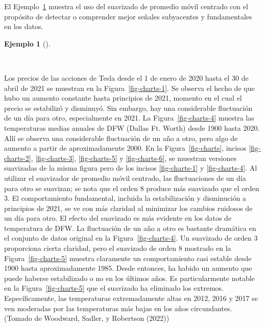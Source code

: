 \documentclass[
  us-letterpaper,
]{scrreprt}
\theoremstyle{plain}
\theoremstyle{definition}
\theoremstyle{definition}
\newtheorem{example}{Ejemplo}[chapter]
\theoremstyle{plain}
\theoremstyle{remark}
\begin{document}
El Ejemplo~\ref{exm-ejem} muestra el uso del suavizado de promedio móvil
centrado con el propósito de detectar o comprender mejor señales
subyacentes y fundamentales en los datos.

\begin{example}[]\protect\hypertarget{exm-ejem}{}\label{exm-ejem}

~

\begin{tcolorbox}[enhanced jigsaw, breakable, colbacktitle=quarto-callout-caution-color!10!white, rightrule=.15mm, toptitle=1mm, colback=white, left=2mm, colframe=quarto-callout-caution-color-frame, bottomtitle=1mm, opacitybacktitle=0.6, leftrule=.75mm, arc=.35mm, title={Suavizando los datos de temperatura de Tesla y DFW.}, coltitle=black, titlerule=0mm, opacityback=0, bottomrule=.15mm, toprule=.15mm]

Los precios de las acciones de Tesla desde el 1 de enero de 2020 hasta
el 30 de abril de 2021 se muestran en la Figura~\ref{fig-charts-1}. Se
observa el hecho de que hubo un aumento constante hasta principios de
2021, momento en el cual el precio se estabilizó y disminuyó. Sin
embargo, hay una considerable fluctuación de un día para otro,
especialmente en 2021. La Figura~\ref{fig-charts-4} muestra las
temperaturas medias anuales de DFW (Dallas Ft. Worth) desde 1900 hasta
2020. Allí se observa una considerable fluctuación de un año a otro,
pero algo de aumento a partir de aproximadamente 2000. En la
Figura~\ref{fig-charts}, incisos \ref{fig-charts-2}, \ref{fig-charts-3},
\ref{fig-charts-5} y \ref{fig-charts-6}, se muestran versiones
suavizadas de la misma figura pero de los incisos \ref{fig-charts-1} y
\ref{fig-charts-4}. Al utilizar el suavizador de promedio móvil
centrado, las fluctuaciones de un día para otro se suavizan; se nota que
el orden 8 produce más suavizado que el orden 3. El comportamiento
fundamental, incluida la estabilización y disminución a principios de
2021, se ve con más claridad al minimizar los cambios ruidosos de un día
para otro. El efecto del suavizado es más evidente en los datos de
temperatura de DFW. La fluctuación de un año a otro es bastante
dramática en el conjunto de datos original en la
Figura~\ref{fig-charts-4}. Un suavizado de orden 3 proporciona cierta
claridad, pero el suavizado de orden 8 mostrado en la
Figura~\ref{fig-charts-5} muestra claramente un comportamiento casi
estable desde 1900 hasta aproximadamente 1985. Desde entonces, ha habido
un aumento que puede haberse estabilizado o no en los últimos años. Es
particularmente notable en la Figura~\ref{fig-charts-5} que el suavizado
ha eliminado los extremos. Específicamente, las temperaturas
extremadamente altas en 2012, 2016 y 2017 se ven moderadas por las
temperaturas más bajas en los años circundantes. (Tomado de Woodward,
Sadler, y Robertson (2022))


\end{tcolorbox}
\end{example}
\end{document}

